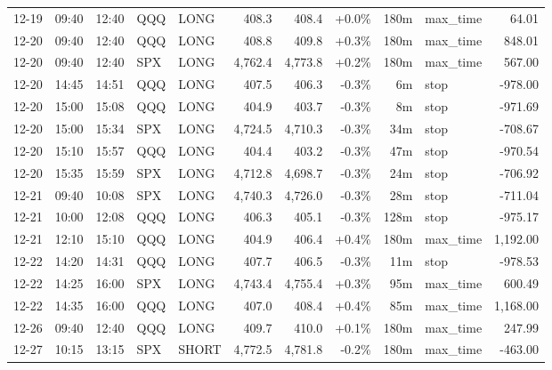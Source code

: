 \documentclass[11pt,a4paper,twoside]{article}
\begin{document}
\begin{center}
\begin{longtable}{>{\color{txtmain}}l l l l l r r r r >{\color{txtmain}}l r}
12-19 & 09:40 & 12:40 & QQQ & LONG & 408.3 & 408.4 & \textcolor{wingreen}{+0.0\%} & 180m & max\_time & \textcolor{wingreen}{64.01} \\
12-20 & 09:40 & 12:40 & QQQ & LONG & 408.8 & 409.8 & \textcolor{wingreen}{+0.3\%} & 180m & max\_time & \textcolor{wingreen}{848.01} \\
12-20 & 09:40 & 12:40 & SPX & LONG & 4,762.4 & 4,773.8 & \textcolor{wingreen}{+0.2\%} & 180m & max\_time & \textcolor{wingreen}{567.00} \\
12-20 & 14:45 & 14:51 & QQQ & LONG & 407.5 & 406.3 & \textcolor{lossred}{-0.3\%} & 6m & stop & \textcolor{lossred}{-978.00} \\
12-20 & 15:00 & 15:08 & QQQ & LONG & 404.9 & 403.7 & \textcolor{lossred}{-0.3\%} & 8m & stop & \textcolor{lossred}{-971.69} \\
12-20 & 15:00 & 15:34 & SPX & LONG & 4,724.5 & 4,710.3 & \textcolor{lossred}{-0.3\%} & 34m & stop & \textcolor{lossred}{-708.67} \\
12-20 & 15:10 & 15:57 & QQQ & LONG & 404.4 & 403.2 & \textcolor{lossred}{-0.3\%} & 47m & stop & \textcolor{lossred}{-970.54} \\
12-20 & 15:35 & 15:59 & SPX & LONG & 4,712.8 & 4,698.7 & \textcolor{lossred}{-0.3\%} & 24m & stop & \textcolor{lossred}{-706.92} \\
12-21 & 09:40 & 10:08 & SPX & LONG & 4,740.3 & 4,726.0 & \textcolor{lossred}{-0.3\%} & 28m & stop & \textcolor{lossred}{-711.04} \\
12-21 & 10:00 & 12:08 & QQQ & LONG & 406.3 & 405.1 & \textcolor{lossred}{-0.3\%} & 128m & stop & \textcolor{lossred}{-975.17} \\
12-21 & 12:10 & 15:10 & QQQ & LONG & 404.9 & 406.4 & \textcolor{wingreen}{+0.4\%} & 180m & max\_time & \textcolor{wingreen}{1,192.00} \\
12-22 & 14:20 & 14:31 & QQQ & LONG & 407.7 & 406.5 & \textcolor{lossred}{-0.3\%} & 11m & stop & \textcolor{lossred}{-978.53} \\
12-22 & 14:25 & 16:00 & SPX & LONG & 4,743.4 & 4,755.4 & \textcolor{wingreen}{+0.3\%} & 95m & max\_time & \textcolor{wingreen}{600.49} \\
12-22 & 14:35 & 16:00 & QQQ & LONG & 407.0 & 408.4 & \textcolor{wingreen}{+0.4\%} & 85m & max\_time & \textcolor{wingreen}{1,168.00} \\
12-26 & 09:40 & 12:40 & QQQ & LONG & 409.7 & 410.0 & \textcolor{wingreen}{+0.1\%} & 180m & max\_time & \textcolor{wingreen}{247.99} \\
12-27 & 10:15 & 13:15 & SPX & SHORT & 4,772.5 & 4,781.8 & \textcolor{lossred}{-0.2\%} & 180m & max\_time & \textcolor{lossred}{-463.00} \\

\end{longtable}
\end{center}
\end{document}
